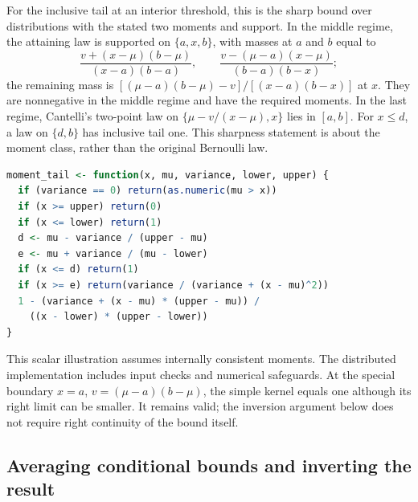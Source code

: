 \documentclass[11pt,letterpaper]{article}
\numberwithin{equation}{section}
\theoremstyle{definition}
\theoremstyle{remark}
\begin{document}
For the inclusive tail at an interior threshold, this is the sharp bound
over distributions with the stated two moments and support. In the middle
regime, the attaining law is supported on $\{a,x,b\}$, with masses at
$a$ and $b$ equal to
\[
 \frac{v+(x-\mu)(b-\mu)}{(x-a)(b-a)},\qquad
 \frac{v-(\mu-a)(x-\mu)}{(b-a)(b-x)};
\]
the remaining mass is
$[(\mu-a)(b-\mu)-v]/[(x-a)(b-x)]$ at $x$. They are nonnegative in
the middle regime and have the required moments. In the last regime,
Cantelli's two-point law on $\{\mu-v/(x-\mu),x\}$ lies in $[a,b]$.
For $x\le d$, a law on $\{d,b\}$ has inclusive tail one. This sharpness
statement is about the moment class, rather than the original Bernoulli law.


\begin{minipage}{\linewidth}
\begin{lstlisting}[language=R]
moment_tail <- function(x, mu, variance, lower, upper) {
  if (variance == 0) return(as.numeric(mu > x))
  if (x >= upper) return(0)
  if (x <= lower) return(1)
  d <- mu - variance / (upper - mu)
  e <- mu + variance / (mu - lower)
  if (x <= d) return(1)
  if (x >= e) return(variance / (variance + (x - mu)^2))
  1 - (variance + (x - mu) * (upper - mu)) /
    ((x - lower) * (upper - lower))
}
\end{lstlisting}
\end{minipage}

This scalar illustration assumes internally consistent moments. The
distributed implementation includes input checks and numerical safeguards. At the special
boundary $x=a$, $v=(\mu-a)(b-\mu)$, the simple kernel equals one
although its right limit can be smaller. It remains valid; the inversion
argument below does not require right continuity of the bound itself.

\subsection{Averaging conditional bounds and inverting the result}
\end{document}
